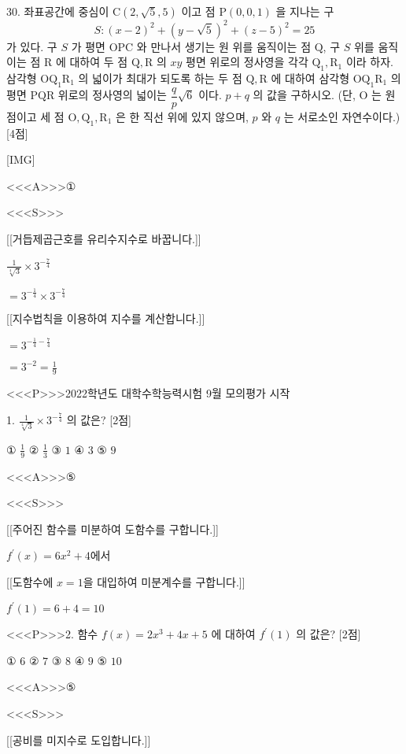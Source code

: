 \documentclass{oblivoir}
\begin{document}
30. 좌표공간에 중심이 $\mathrm{C}(2, \sqrt{5}, 5)$ 이고 점 $\mathrm{P}(0,0,1)$ 을 지나는 구
$$
S:(x-2)^{2}+(y-\sqrt{5})^{2}+(z-5)^{2}=25
$$
가 있다. 구 $S$ 가 평면 $\mathrm{OPC}$ 와 만나서 생기는 원 위를 움직이는 점 $\mathrm{Q}$, 구 $S$ 위를 움직이는 점 $\mathrm{R}$ 에 대하여 두 점 $\mathrm{Q}, \mathrm{R}$ 의 $x y$ 평면 위로의 정사영을 각각 $\mathrm{Q}_{1}, \mathrm{R}_{1}$ 이라 하자.
삼각형 $\mathrm{OQ}_{1} \mathrm{R}_{1}$ 의 넓이가 최대가 되도록 하는 두 점 $\mathrm{Q}, \mathrm{R}$ 에 대하여 삼각형 $\mathrm{OQ}_{1} \mathrm{R}_{1}$ 의 평면 $\mathrm{PQR}$ 위로의 정사영의 넓이는 $\dfrac{q}{p} \sqrt{6}$ 이다. $p+q$ 의 값을 구하시오.
(단, $\mathrm{O}$ 는 원점이고 세 점 $\mathrm{O}, \mathrm{Q}_{1}, \mathrm{R}_{1}$ 은 한 직선 위에 있지 않으며, $p$ 와 $q$ 는 서로소인 자연수이다.) [4점]

[IMG]








<<<A>>>①

<<<S>>>

[[거듭제곱근호를 유리수지수로 바꿉니다.]]

$\frac{1}{\sqrt[4]{3}} \times 3^{-\frac{7}{4}}$

$=3^{-\frac{1}{4}} \times 3^{-\frac{7}{4}}$

[[지수법칙을 이용하여 지수를 계산합니다.]]

$=3^{-\frac{1}{4}-\frac{7}{4}}$

$=3^{-2}=\frac{1}{9}$

<<<P>>>2022학년도 대학수학능력시험 9월 모의평가 시작

1. $\frac{1}{\sqrt[4]{3}} \times 3^{-\frac{7}{4}}$ 의 값은? [2점]

① $\frac{1}{9}$
② $\frac{1}{3}$
③ $1$
④ $3$
⑤ $9$


<<<A>>>⑤

<<<S>>>

[[주어진 함수를 미분하여 도함수를 구합니다.]]

$ f^{\prime}(x)=6 x^{2}+4$에서

[[도함수에 $x=1$을 대입하여 미분계수를 구합니다.]]

$f^{\prime}(1)=6+4=10$


<<<P>>>2. 함수 $f(x)=2 x^{3}+4 x+5$ 에 대하여 $f^{\prime}(1)$ 의 값은? [2점]

① $6$
② $7$
③ $8$
④ $9$
⑤ $10$

<<<A>>>⑤

<<<S>>>

[[공비를 미지수로 도입합니다.]]
\end{document}
